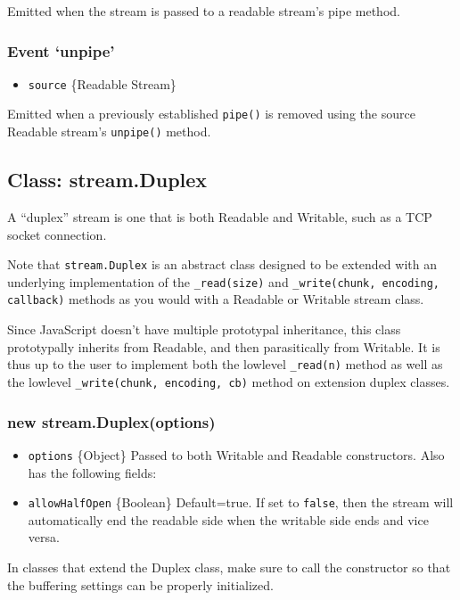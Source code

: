 Emitted when the stream is passed to a readable stream's pipe method.

\subsubsection{Event `unpipe'}

\begin{itemize}
\item
  \texttt{source} \{Readable Stream\}
\end{itemize}

Emitted when a previously established \texttt{pipe()} is removed using
the source Readable stream's \texttt{unpipe()} method.

\subsection{Class: stream.Duplex}

A ``duplex'' stream is one that is both Readable and Writable, such as a
TCP socket connection.

Note that \texttt{stream.Duplex} is an abstract class designed to be
extended with an underlying implementation of the \texttt{\_read(size)}
and \texttt{\_write(chunk, encoding, callback)} methods as you would
with a Readable or Writable stream class.

Since JavaScript doesn't have multiple prototypal inheritance, this
class prototypally inherits from Readable, and then parasitically from
Writable. It is thus up to the user to implement both the lowlevel
\texttt{\_read(n)} method as well as the lowlevel
\texttt{\_write(chunk, encoding, cb)} method on extension duplex
classes.

\subsubsection{new stream.Duplex(options)}

\begin{itemize}
\item
  \texttt{options} \{Object\} Passed to both Writable and Readable
  constructors. Also has the following fields:
\item
  \texttt{allowHalfOpen} \{Boolean\} Default=true. If set to
  \texttt{false}, then the stream will automatically end the readable
  side when the writable side ends and vice versa.
\end{itemize}

In classes that extend the Duplex class, make sure to call the
constructor so that the buffering settings can be properly initialized.

